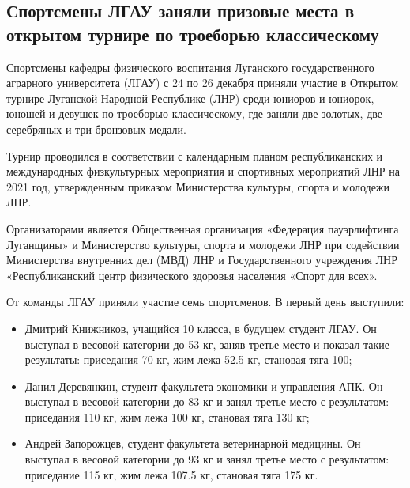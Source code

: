  
 
 
 
 
\subsection{Спортсмены ЛГАУ заняли призовые места в открытом турнире по троеборью классическому}
\label{sec:27_12_2021.stz.edu.lnr.lgau.1.studenty_trojeborje}



Спортсмены кафедры физического воспитания Луганского государственного аграрного
университета (ЛГАУ) с 24 по 26 декабря приняли участие в Открытом турнире
Луганской Народной Республике (ЛНР) среди юниоров и юниорок, юношей и девушек
по троеборью классическому, где заняли две золотых, две серебряных и три
бронзовых медали.


Турнир проводился в соответствии с календарным планом республиканских и
международных физкультурных мероприятия и спортивных мероприятий ЛНР на 2021
год, утвержденным приказом Министерства культуры, спорта и молодежи ЛНР.

Организаторами является Общественная организация «Федерация пауэрлифтинга
Луганщины» и Министерство культуры, спорта и молодежи ЛНР при содействии
Министерства внутренних дел (МВД) ЛНР и Государственного учреждения ЛНР
«Республиканский центр физического здоровья населения «Спорт для всех».

От команды ЛГАУ приняли участие семь спортсменов. В первый день выступили:

\begin{itemize} %
\item Дмитрий Книжников, учащийся 10 класса, в будущем студент ЛГАУ. Он
выступал в весовой категории до 53 кг, заняв третье место и показал такие
результаты: приседания 70 кг, жим лежа 52.5 кг, становая тяга 100;

\item Данил Деревянкин, студент факультета экономики и управления АПК. Он
выступал в весовой категории до 83 кг и занял третье место с результатом:
приседания 110 кг, жим лежа 100 кг, становая тяга 130 кг;

\item Андрей Запорожцев, студент факультета ветеринарной медицины. Он выступал
в весовой категории до 93 кг и занял третье место с результатом: приседание 115
кг, жим лежа 107.5 кг, становая тяга 175 кг.
\end{itemize} %

